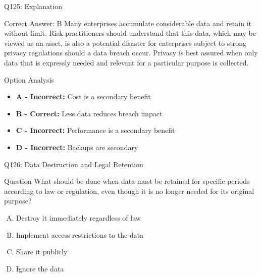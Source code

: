 \documentclass{beamer}
\begin{document}
	\begin{frame}{Q125: Explanation}
		\begin{block}{Correct Answer: B}
			Many enterprises accumulate considerable data and retain it without limit. Risk practitioners should understand that this data, which may be viewed as an asset, is also a potential disaster for enterprises subject to strong privacy regulations should a data breach occur. Privacy is best assured when only data that is expressly needed and relevant for a particular purpose is collected.
		\end{block}
		\begin{block}{Option Analysis}
			\begin{itemize}
				\item \textbf{A - Incorrect:} Cost is a secondary benefit
				\item \textbf{B - Correct:} Less data reduces breach impact
				\item \textbf{C - Incorrect:} Performance is a secondary benefit
				\item \textbf{D - Incorrect:} Backups are secondary
			\end{itemize}
		\end{block}
	\end{frame}
	
	\begin{frame}{Q126: Data Destruction and Legal Retention}
		\begin{block}{Question}
			What should be done when data must be retained for specific periods according to law or regulation, even though it is no longer needed for its original purpose?
		\end{block}
		\begin{enumerate}[(A)]
			\item Destroy it immediately regardless of law
			\item Implement access restrictions to the data
			\item Share it publicly
			\item Ignore the data
		\end{enumerate}
	\end{frame}
	
\end{document}
